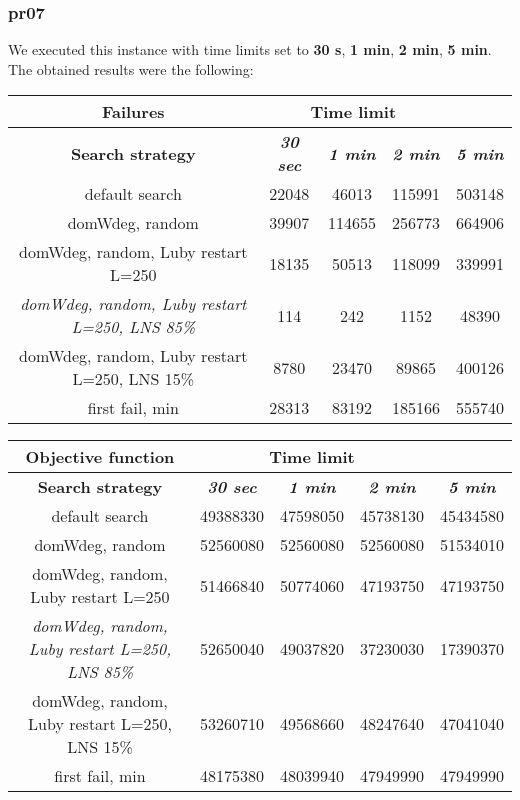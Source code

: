 \subsubsection{pr07}
We executed this instance with time limits set to \textbf{30 s}, \textbf{1 min}, \textbf{2 min}, \textbf{5 min}.\\
The obtained results were the following:
{
\renewcommand{\arraystretch}{2}
\begin{longtable}[h]{| c | c | c | c | c |}
    \hline
    \textbf{Failures} & \multicolumn{3}{c}{Time limit} & \\
    \hline
    \textbf{Search strategy} & \textbf{\textit{30 sec}} & \textbf{\textit{1 min}} & \textbf{\textit{2 min}} & \textbf{\textit{5 min}} \\
    \hline
    \endhead
    default search                                         & 22048 &  46013 & 115991 & 503148 \\
    \hline
    domWdeg, random                                        & 39907 & 114655 & 256773 & 664906 \\
    \hline
    domWdeg, random, Luby restart L=250                    & 18135 &  50513 & 118099 & 339991 \\
    \hline
    \textit{domWdeg, random, Luby restart L=250, LNS 85\%} &   114 &    242 &   1152 &  48390 \\
    \hline
    domWdeg, random, Luby restart L=250, LNS 15\%          &  8780 &  23470 &  89865 & 400126 \\
    \hline
    first fail, min                                        & 28313 &  83192 & 185166 & 555740 \\
    \hline
\end{longtable}
}

{
\renewcommand{\arraystretch}{2}
\begin{longtable}[h]{| c | c | c | c | c |}
    \hline
    \textbf{Objective function} & \multicolumn{3}{c}{Time limit} & \\
    \hline
    \textbf{Search strategy} & \textbf{\textit{30 sec}} & \textbf{\textit{1 min}} & \textbf{\textit{2 min}} & \textbf{\textit{5 min}} \\
    \hline
    \endhead
    default search                                         & 49388330 & 47598050 & 45738130 & 45434580 \\
    \hline
    domWdeg, random                                        & 52560080 & 52560080 & 52560080 & 51534010 \\
    \hline
    domWdeg, random, Luby restart L=250                    & 51466840 & 50774060 & 47193750 & 47193750 \\
    \hline
    \textit{domWdeg, random, Luby restart L=250, LNS 85\%} & 52650040 & 49037820 & 37230030 & 17390370 \\
    \hline
    domWdeg, random, Luby restart L=250, LNS 15\%          & 53260710 & 49568660 & 48247640 & 47041040 \\
    \hline
    first fail, min                                        & 48175380 & 48039940 & 47949990 & 47949990 \\
    \hline
\end{longtable}
}